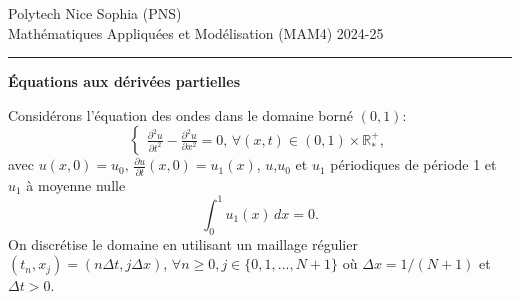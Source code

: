 \documentclass[12pt,a4paper]{article}
\begin{document}
 \hfill Polytech Nice Sophia (PNS)\\
\noindent Math\'ematiques Appliqu\'ees et Mod\'elisation (MAM4) \hfill 2024-25 \\

\hrule

\bigskip
\bigskip

\begin{center}{\bf \'Equations aux d\'eriv\'ees partielles}\end{center}

\bigskip

\parskip 12pt
\noindent Consid\'erons l'\'equation des ondes dans le domaine born\'e $(0,1)$:
$$
\begin{cases}
\displaystyle\frac{\partial^2 u}{\partial t^2}-\frac{\partial^2 u}{\partial
  x^2}=0,\, \forall (x,t)\in(0,1)\times\mathbb{R}^+_*,
\end{cases}
$$
avec $u(x, 0) = u_0,\, \displaystyle\frac{\partial u}{\partial t}(x,0)=u_1(x)$,
$u$,$u_0$ et $u_1$ p\'eriodiques de p\'eriode 1 et $u_1$ \`a moyenne nulle
$$
\int_0^1 u_1(x)\,dx =0.
$$
On discr\'etise le domaine en utilisant un maillage r\'egulier
$(t_n,x_j)=(n\Delta t,j\Delta x)$,  $\forall n\ge 0,
j\in\{0,1,...,N+1\}$ o\`u $\Delta x=1/(N+1)$ et $\Delta t>0$.\\
\end{document}
